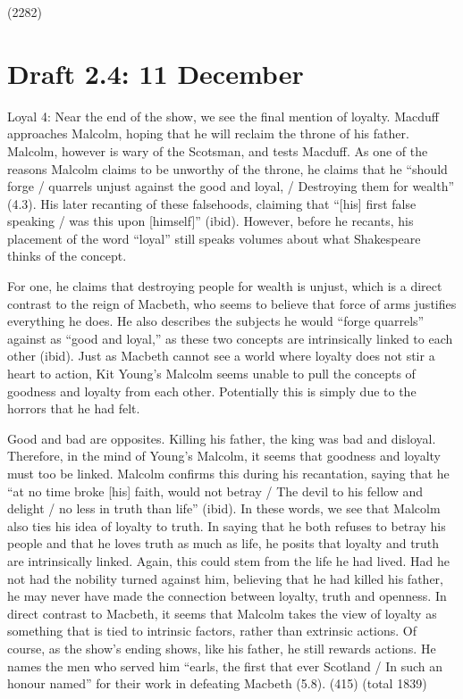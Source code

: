\documentclass[12pt]{article}[titlepage]
\newcommand{\say}[1]{``#1''}
\newcommand{\1}{\={a}}
\newcommand{\2}{\={e}}
\newcommand{\3}{\={\i}}
\newcommand{\4}{\=o}
\newcommand{\5}{\=u}
\newcommand{\6}{\={A}}
\renewcommand{\,}{\textsuperscript{,}}
\begin{document}
(2282)
\section{Draft 2.4: 11 December}
Loyal 4:
Near the end of the show, we see the final mention of loyalty.
Macduff approaches Malcolm, hoping that he will reclaim the throne of his father.
Malcolm, however is wary of the Scotsman, and tests Macduff.
As one of the reasons Malcolm claims to be unworthy of the throne, he claims that he \say{should forge / quarrels unjust against the good and loyal, / Destroying them for wealth} (4.3).
His later recanting of these falsehoods, claiming that \say{[his] first false speaking / was this upon [himself]} (ibid).
However, before he recants, his placement of the word \say{loyal} still speaks volumes about what Shakespeare thinks of the concept.

For one, he claims that destroying people for wealth is unjust, which is a direct contrast to the reign of Macbeth, who seems to believe that force of arms justifies everything he does.
He also describes the subjects he would \say{forge quarrels} against as \say{good and loyal,} as these two concepts are intrinsically linked to each other (ibid).
Just as Macbeth cannot see a world where loyalty does not stir a heart to action, Kit Young's Malcolm seems unable to pull the concepts of goodness and loyalty from each other.
Potentially this is simply due to the horrors that he had felt.

Good and bad are opposites.
Killing his father, the king was bad and disloyal.
Therefore, in the mind of Young's Malcolm, it seems that goodness and loyalty must too be linked.
Malcolm confirms this during his recantation, saying that he \say{at no time broke [his] faith, would not betray / The devil to his fellow and delight / no less in truth than life} (ibid).
In these words, we see that Malcolm also ties his idea of loyalty to truth.
In saying that he both refuses to betray his people and that he loves truth as much as life, he posits that loyalty and truth are intrinsically linked.
Again, this could stem from the life he had lived.
Had he not had the nobility turned against him, believing that he had killed his father, he may never have made the connection between loyalty, truth and openness.
In direct contrast to Macbeth, it seems that Malcolm takes the view of loyalty as something that is tied to intrinsic factors, rather than extrinsic actions.
Of course, as the show's ending shows, like his father, he still rewards actions.
He names the men who served him \say{earls, the first that ever Scotland / In such an honour named} for their work in defeating Macbeth (5.8).
(415) (total 1839)
\end{document}
